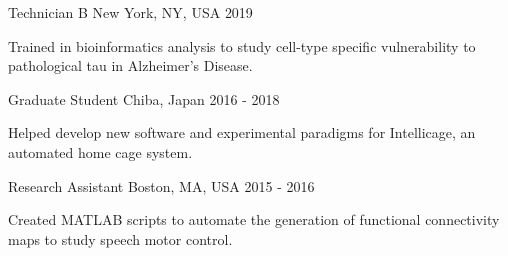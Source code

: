 %
%
%

\vspace*{0.35cm}

\begin{cventries}

    {Technician B}
    {New York, NY, USA}
    {2019}
    {\begin{cvitems}
        \item Trained in bioinformatics analysis to study cell-type specific vulnerability to pathological tau in Alzheimer's Disease.
    \end{cvitems}\vspace{1.5\baselineskip}}

    \vspace*{0.2cm}

    {Graduate Student}
    {Chiba, Japan}
    {2016 - 2018}
    {\begin{cvitems}
        \item Helped develop new software and experimental paradigms for Intellicage, an automated home cage system.
    \end{cvitems}\vspace{1.5\baselineskip}}

    \vspace*{0.2cm}

    {Research Assistant}
    {Boston, MA, USA}
    {2015 - 2016}
    {\begin{cvitems}
        \item Created MATLAB scripts to automate the generation of functional connectivity maps to study speech motor control.
    \end{cvitems}\vspace{1.5\baselineskip}}
    
\end{cventries}

\vspace*{-0.35cm}

